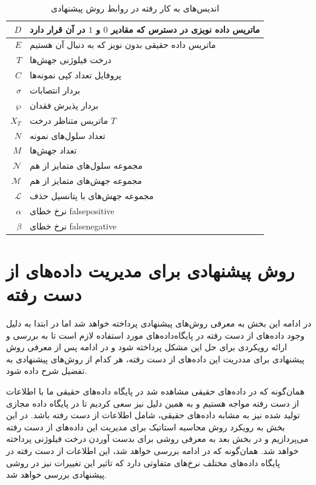 	\begin{table}[ht]
	\caption{اندیس‌های به کار رفته در روابط روش پیشنهادی}
	\label{tab:ch_pm:firstpmIndices}
	\centering
	\onehalfspacing
	\begin{tabularx}{0.9\textwidth}{|r|X|}
		\hline
		$D$	& ماتریس داده نویزی در دسترس که مقادیر $0$ و $1$ در آن قرار دارد \\
		\hline
		$E$	& ماتریس داده حقیقی بدون نویز که به دنبال آن هستیم \\
		\hline
		$T$	& درخت فیلوژنی جهش‌ها \\
		\hline
		$C$ & پروفایل تعداد کپی نمونه‌ها \\
		\hline
		$\sigma$	 & بردار انتصابات \\
		\hline
		$\wp$ & بردار پذیرش فقدان$  $ \\
		\hline
		$X_T$	& ماتریس متناظر درخت $T$ \\
		\hline
		$N$	& تعداد سلول‌های نمونه \\
		\hline
		$M$	& تعداد جهش‌ها \\
		\hline
		$\mathcal{N}$ & مجموعه سلول‌های متمایز از هم \\
		\hline
		$\mathcal{M}$ & مجموعه جهش‌های متمایز از هم \\
		\hline
		$\mathcal{L}$ & مجموعه جهش‌های با پتانسیل حذف \\
		\hline
		$\alpha$	&  نرخ خطای \gls{falsepositive} \\
		\hline
		$\beta$	& نرخ خطای \gls{falsenegative} \\
		\hline
	\end{tabularx}
\end{table}



\section{روش پیشنهادی برای مدیریت داده‌های از دست رفته}

در ادامه این بخش به معرفی روش‌های پیشنهادی پرداخته خواهد شد اما در ابتدا به دلیل وجود داده‌های از دست رفته در پایگاه‌داده‌های مورد استفاده لازم است تا به بررسی و ارائه رویکردی برای حل این مشکل پرداخته شود و در ادامه پس از معرفی روش پیشنهادی برای مددریت این داده‌های از دست رفته، هر کدام از روش‌های پیشنهادی به تفضیل شرح داده شود.

همان‌گونه که در داده‌های حقیقی مشاهده شد در پایگاه داده‌های حقیقی ما با اطلاعات از دست رفته مواجه هستیم و به همین دلیل نیز سعی کردیم تا در پایگاه داده مجازی تولید شده نیز به مشابه داده‌های حقیقی، شامل اطلاعات از دست رفته باشد. در این بخش به رویکرد روش محاسبه استاتیک برای مدیریت این داده‌های از دست رفته می‌پردازیم و در بخش بعد به معرفی روشی برای بدست آوردن درخت فیلوژنی پرداخته خواهد شد. همان‌گونه که در ادامه بررسی خواهد شد، این اطلاعات از دست رفته در پایگاه داده‌های مختلف نرخ‌های متفاوتی دارد که تاثیر این تغییرات نیز در روشی پیشنهادی بررسی خواهد شد.

